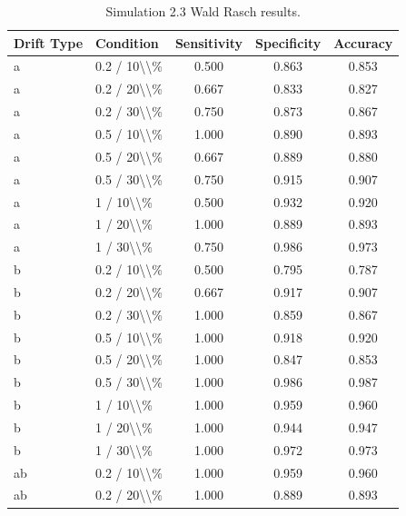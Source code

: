 \begin{table}[!h]
\centering
\caption{\label{tab:tab:sim23_rasch}Simulation 2.3 Wald Rasch results.}
\centering
\begin{tabular}[t]{llccc}
\toprule
Drift Type & Condition & Sensitivity & Specificity & Accuracy\\
\midrule
a & 0.2 / 10\textbackslash{}\textbackslash{}\% & 0.500 & 0.863 & 0.853\\
a & 0.2 / 20\textbackslash{}\textbackslash{}\% & 0.667 & 0.833 & 0.827\\
a & 0.2 / 30\textbackslash{}\textbackslash{}\% & 0.750 & 0.873 & 0.867\\
a & 0.5 / 10\textbackslash{}\textbackslash{}\% & 1.000 & 0.890 & 0.893\\
a & 0.5 / 20\textbackslash{}\textbackslash{}\% & 0.667 & 0.889 & 0.880\\
\addlinespace
a & 0.5 / 30\textbackslash{}\textbackslash{}\% & 0.750 & 0.915 & 0.907\\
a & 1 / 10\textbackslash{}\textbackslash{}\% & 0.500 & 0.932 & 0.920\\
a & 1 / 20\textbackslash{}\textbackslash{}\% & 1.000 & 0.889 & 0.893\\
a & 1 / 30\textbackslash{}\textbackslash{}\% & 0.750 & 0.986 & 0.973\\
b & 0.2 / 10\textbackslash{}\textbackslash{}\% & 0.500 & 0.795 & 0.787\\
\addlinespace
b & 0.2 / 20\textbackslash{}\textbackslash{}\% & 0.667 & 0.917 & 0.907\\
b & 0.2 / 30\textbackslash{}\textbackslash{}\% & 1.000 & 0.859 & 0.867\\
b & 0.5 / 10\textbackslash{}\textbackslash{}\% & 1.000 & 0.918 & 0.920\\
b & 0.5 / 20\textbackslash{}\textbackslash{}\% & 1.000 & 0.847 & 0.853\\
b & 0.5 / 30\textbackslash{}\textbackslash{}\% & 1.000 & 0.986 & 0.987\\
\addlinespace
b & 1 / 10\textbackslash{}\textbackslash{}\% & 1.000 & 0.959 & 0.960\\
b & 1 / 20\textbackslash{}\textbackslash{}\% & 1.000 & 0.944 & 0.947\\
b & 1 / 30\textbackslash{}\textbackslash{}\% & 1.000 & 0.972 & 0.973\\
ab & 0.2 / 10\textbackslash{}\textbackslash{}\% & 1.000 & 0.959 & 0.960\\
ab & 0.2 / 20\textbackslash{}\textbackslash{}\% & 1.000 & 0.889 & 0.893\\

\end{tabular}
\end{table}

